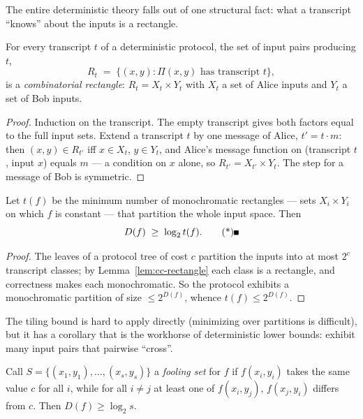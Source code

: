 The entire deterministic theory falls out of one structural fact: what a transcript
``knows'' about the inputs is a rectangle.

\begin{lemma}\label{lem:cc-rectangle}
For every transcript $t$ of a deterministic protocol, the set of input pairs producing
$t$,
\[
R_t \;=\; \bigl\{(x,y) : \Pi(x,y) \text{ has transcript } t\bigr\},
\]
is a \emph{combinatorial rectangle}: $R_t = X_t \times Y_t$ with $X_t$ a set of Alice
inputs and $Y_t$ a set of Bob inputs. \eop
\end{lemma}

\begin{proof}
Induction on the transcript. The empty transcript gives both factors equal to the full
input sets. Extend a transcript $t$ by one message of Alice, $t' = t\cdot m$: then
$(x,y) \in R_{t'}$ iff $x \in X_t$, $y \in Y_t$, and Alice's message function on
(transcript $t$, input $x$) equals $m$ --- a condition on $x$ alone, so
$R_{t'} = X_{t'} \times Y_t$. The step for a message of Bob is symmetric.
\end{proof}

\begin{theorem}\label{thm:cc-tiling}
Let $t(f)$ be the minimum number of monochromatic rectangles --- sets $X_i \times Y_i$
on which $f$ is constant --- that partition the whole input space. Then
\[
D(f) \;\ge\; \log_2 t(f). \eopm
\]
\end{theorem}

\begin{proof}
The leaves of a protocol tree of cost $c$ partition the inputs into at most $2^c$
transcript classes; by Lemma~\ref{lem:cc-rectangle} each class is a rectangle, and
correctness makes each monochromatic. So the protocol exhibits a monochromatic
partition of size $\le 2^{D(f)}$, whence $t(f) \le 2^{D(f)}$.
\end{proof}

The tiling bound is hard to apply directly (minimizing over partitions is difficult),
but it has a corollary that is the workhorse of deterministic lower bounds: exhibit
many input pairs that pairwise ``cross''.

\begin{corollary}\label{cor:cc-fooling}
Call $S = \{(x_1,y_1),\dots,(x_s,y_s)\}$ a \emph{fooling set} for $f$ if $f(x_i,y_i)$
takes the same value $c$ for all $i$, while for all $i \ne j$ at least one of
$f(x_i,y_j)$, $f(x_j,y_i)$ differs from $c$. Then $D(f) \ge \log_2 s$. \eop
\end{corollary}

